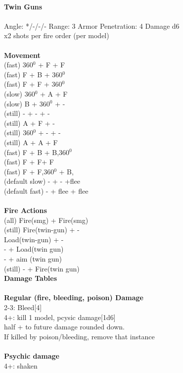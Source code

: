 \ \\
{\bf Twin Guns } \\
\ \\
Angle: */-/-/- Range: 3 Armor Penetration: 4 Damage d6 \\
\indent x2 shots per fire order (per model) \\





\ \\ {\bf Movement } \\
(fast) 360$^0$ + F + F \\
(fast) F + B + 360$^0$ \\
(fast) F + F + 360$^0$ \\
(slow) 360$^0$ + A + F \\
(slow) B + 360$^0$ + - \\
(still) - + -  + - \\
(still) A + F + - \\
(still) 360$^0$ + - + - \\
(still) A + A + F \\
(fast) F + B + B,360$^0$ \\
(fast) F + F+ F \\
(fast) F + F,360$^0$ + B, \\
(default slow) - + - +flee \\
(default fast) - + flee + flee \\
\ \\ {\bf Fire Actions } \\
(all) Fire(smg) + Fire(smg) \\
(still) Fire(twin-gun) + -  \\
Load(twin-gun) + - \\
- + Load(twin gun) \\
- + aim (twin gun) \\
(still) - + Fire(twin gun) \\



{\bf Damage Tables} \\
\ \\ {\bf Regular (fire, bleeding, poison) Damage } \\
2-3: Bleed[4] \\
4+: kill 1 model, pcysic damage[1d6]\\ half + to future damage rounded down. \\ If killed by poison/bleeding, remove that instance \\
\ \\ {\bf Psychic damage } \\
4+: shaken \\


